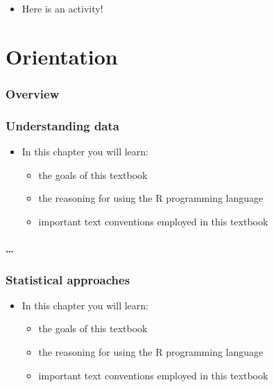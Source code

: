 \documentclass[
]{article}
\providecommand{\tightlist}{%
  \setlength{\itemsep}{0pt}\setlength{\parskip}{0pt}}
\newenvironment{rmdblock}[1]
  {\begin{shaded*}
  \begin{itemize}
  \renewcommand{\labelitemi}{
    \raisebox{-.5\height}[0pt][0pt]{
      {\setkeys{Gin}{width=2em,keepaspectratio}\texttt{[image: assets/images/\#1]}}
    }
  }
  \item
  }
  {
  \end{itemize}
  \end{shaded*}
  }
\newenvironment{rmdkey}
  {\begin{rmdblock}{key}}
  {\end{rmdblock}}
\newenvironment{rmdactivity}
  {\begin{rmdblock}{code}}
  {\end{rmdblock}}
\begin{document}
\begin{rmdactivity}
Here is an activity!
\end{rmdactivity}

\hypertarget{part-orientation}{%
\part{Orientation}\label{part-orientation}}

\hypertarget{orientation-overview}{%
\section*{Overview}\label{orientation-overview}}

\hypertarget{understanding-data}{%
\section{Understanding data}\label{understanding-data}}

\begin{rmdkey}
In this chapter you will learn:

\begin{itemize}
\tightlist
\item
  the goals of this textbook
\item
  the reasoning for using the R programming language
\item
  important text conventions employed in this textbook
\end{itemize}
\end{rmdkey}

\hypertarget{section-1}{%
\subsection{\ldots{}}\label{section-1}}

\citep{Ackoff1989}

\hypertarget{statistical-approaches}{%
\section{Statistical approaches}\label{statistical-approaches}}

\begin{rmdkey}
In this chapter you will learn:

\begin{itemize}
\tightlist
\item
  the goals of this textbook
\item
  the reasoning for using the R programming language
\item
  important text conventions employed in this textbook
\end{itemize}
\end{rmdkey}
\end{document}
